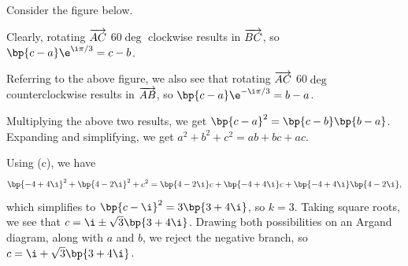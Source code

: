 \begin{solution}
    \begin{ppart}
        Consider the figure below.

        \begin{center}
        \end{center}

        Clearly, rotating $\overrightarrow{AC}$ 60$\deg$ clockwise results in $\overrightarrow{BC}$, so $\bp{c-a} \e^{\i \pi / 3} = c - b$.
    \end{ppart}
    \begin{ppart}
        Referring to the above figure, we also see that rotating $\overrightarrow{AC}$ 60$\deg$ counterclockwise results in $\overrightarrow{AB}$, so $\bp{c - a} \e^{-\i \pi/3} = b - a$.
    \end{ppart}
    \begin{ppart}
        Multiplying the above two results, we get $\bp{c-a}^2 = \bp{c-b}\bp{b-a}$. Expanding and simplifying, we get $a^2 + b^2 + c^2 = ab + bc + ac$.
    \end{ppart}

    Using (c), we have \[\bp{-4 + 4\i}^2 + \bp{4 - 2\i}^2 + c^2 = \bp{4 - 2\i}c + \bp{-4 + 4\i} c + \bp{-4 + 4\i}\bp{4 - 2\i},\] which simplifies to $\bp{c - \i}^2 = 3\bp{3 + 4\i}$, so $k = 3$. Taking square roots, we see that $c = \i \pm \sqrt{3} \bp{3 + 4\i}$. Drawing both possibilities on an Argand diagram, along with $a$ and $b$, we reject the negative branch, so $c = \i + \sqrt{3} \bp{3 + 4\i}$.

    \begin{center}
\end{center}
\end{solution}
